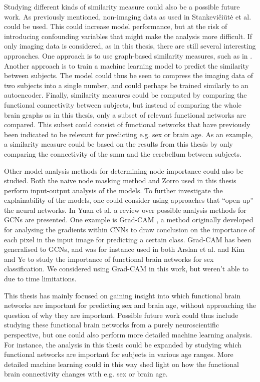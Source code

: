 Studying different kinds of similarity measure could also be a possible future work. As previously mentioned, non-imaging data as used in Stankevičiūtė et al. \cite{stankeviciute} could be used. This could increase model performance, but at the risk of introducing confounding variables that might make the analysis more difficult. If only imaging data is considered, as in this thesis, there are still several interesting approaches. One approach is to use graph-based similarity measures, such as in \cite{higcn}. Another approach is to train a machine learning model to predict the similarity between subjects. The model could thus be seen to compress the imaging data of two subjects into a single number, and could perhaps be trained similarly to an autoencoder. Finally, similarity measures could be computed by comparing the functional connectivity between subjects, but instead of comparing the whole brain graphs as in this thesis, only a subset of relevant functional networks are compared. This subset could consist of functional networks that have previously been indicated to be relevant for predicting e.g. sex or brain age. As an example, a similarity measure could be based on the results from this thesis by only comparing the connectivity of the \acrshort{smm} and the cerebellum between subjects.


Other model analysis methods for determining node importance could also be studied. Both the naive node masking method and Zorro used in this thesis perform input-output analysis of the models. To further investigate the explainability of the models, one could consider using approaches that ``open-up'' the neural networks. In Yuan et al. \cite{yuan_survey} a review over possible analysis methods for GCNs are presented. One example is Grad-CAM \cite{gradcam}, a method originally developed for analysing the gradients within CNNs to draw conclusion on the importance of each pixel in the input image for predicting a certain class. Grad-CAM has been generalised to GCNs, and was for instance used in both Arslan et al. \cite{arslan} and Kim and Ye \cite{understanding_gnn} to study the importance of functional brain networks for sex classification. We considered using Grad-CAM in this work, but weren't able to due to time limitations. 

This thesis has mainly focused on gaining insight into which functional brain networks are important for predicting sex and brain age, without approaching the question of why they are important. Possible future work could thus include studying these functional brain networks from a purely neuroscientific perspective, but one could also perform more detailed machine learning analysis. For instance, the analysis in this thesis could be expanded by studying which functional networks are important for subjects in various age ranges. More detailed machine learning could in this way shed light on how the functional brain connectivity changes with e.g. sex or brain age. 

